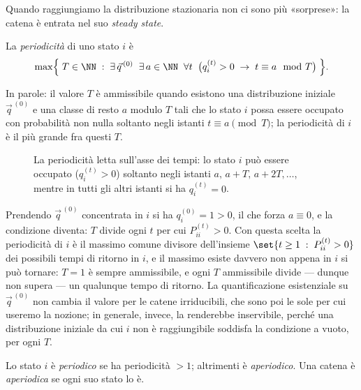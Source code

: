 Quando raggiungiamo la distribuzione stazionaria non ci sono più «sorprese»: la catena è
entrata nel suo \emph{steady state}.

\begin{definizione}\label{def:mc-periodicita}
  La \emph{periodicità} di uno stato $i$ è
  \[
    \max
    \Bigl\{\;
      T\in\NN \;:\;
      \exists\,\vec{q}^{\,(0)}\;\;\exists\,a\in\NN\;\;\forall t\;\;
      \bigl(q_i^{(t)}>0 \;\to\; t\equiv a \mod T\bigr)
    \;\Bigr\}.
  \]
\end{definizione}

In parole: il valore $T$ è ammissibile quando esistono una distribuzione iniziale
$\vec{q}^{\,(0)}$ e una classe di resto $a$ modulo $T$ tali che lo stato $i$ possa essere
occupato con probabilità non nulla soltanto negli istanti $t\equiv a \pmod{T}$; la
periodicità di $i$ è il più grande fra questi $T$.

\begin{figure}[H]
  \centering
  
  \caption{La periodicità letta sull'asse dei tempi: lo stato $i$ può essere occupato
  ($q_i^{(t)}>0$) soltanto negli istanti $a,\,a+T,\,a+2T,\dots$, mentre in tutti gli altri
  istanti si ha $q_i^{(t)}=0$.}
  \label{fig:p78-periodicita}
\end{figure}

\begin{osservazione}
  Prendendo $\vec{q}^{\,(0)}$ concentrata in $i$ si ha $q_i^{(0)} = 1 > 0$, il che forza
  $a \equiv 0$, e la condizione diventa: $T$ divide ogni $t$ per cui $P_{ii}^{(t)}>0$. Con
  questa scelta la periodicità di $i$ è il massimo comune divisore dell'insieme
  $\set{t\ge 1 \;:\; P_{ii}^{(t)}>0}$ dei possibili tempi di ritorno in $i$, e il massimo
  esiste davvero non appena in $i$ si può tornare: $T=1$ è sempre ammissibile, e ogni $T$
  ammissibile divide --- dunque non supera --- un qualunque tempo di ritorno. La
  quantificazione esistenziale su $\vec{q}^{\,(0)}$ non cambia il valore per le catene
  irriducibili, che sono poi le sole per cui useremo la nozione; in generale, invece, la
  renderebbe inservibile, perché una distribuzione iniziale da cui $i$ non è raggiungibile
  soddisfa la condizione a vuoto, per ogni $T$.
\end{osservazione}

\begin{definizione}\label{def:mc-aperiodica}
  Lo stato $i$ è \emph{periodico} se ha periodicità $>1$; altrimenti è \emph{aperiodico}.
  Una catena è \emph{aperiodica} se ogni suo stato lo è.
\end{definizione}


